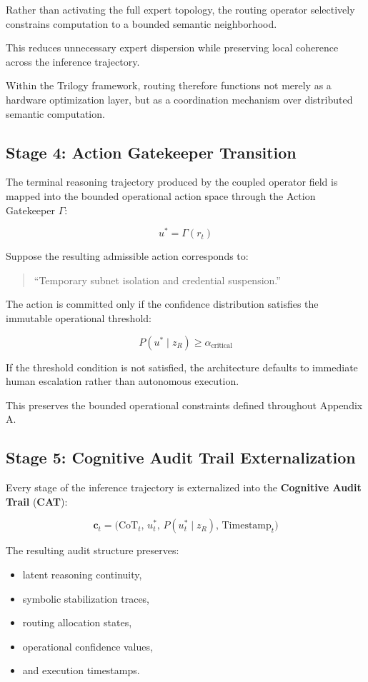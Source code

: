 Rather than activating the full expert topology, the routing operator selectively constrains computation to a bounded
semantic neighborhood.

This reduces unnecessary expert dispersion while preserving
local coherence across the inference trajectory.

Within the Trilogy framework, routing therefore functions not
merely as a hardware optimization layer, but as a coordination
mechanism over distributed semantic computation.

\subsection*{Stage 4: Action Gatekeeper Transition}

The terminal reasoning trajectory produced by the coupled operator field is mapped into the bounded operational action
space through the Action Gatekeeper \(\Gamma\):

\[
u^* = \Gamma(r_t)
\]

Suppose the resulting admissible action corresponds to:

\begin{quote}
``Temporary subnet isolation and credential suspension.''
\end{quote}

The action is committed only if the confidence distribution
satisfies the immutable operational threshold:

\[
P(u^* \mid z_R) \ge \alpha_{\text{critical}}
\]

If the threshold condition is not satisfied, the architecture
defaults to immediate human escalation rather than autonomous
execution.

This preserves the bounded operational constraints defined
throughout Appendix A.

\subsection*{Stage 5: Cognitive Audit Trail Externalization}

Every stage of the inference trajectory is externalized into the \textbf{Cognitive Audit Trail} (\textbf{CAT}):

\[
\mathbf{c}_t =
\Big(
\text{CoT}_t,\,
u_t^*,\,
P(u_t^* \mid z_R),\,
\text{Timestamp}_t
\Big)
\]

The resulting audit structure preserves:

\begin{itemize}
    \item latent reasoning continuity,
    \item symbolic stabilization traces,
    \item routing allocation states,
    \item operational confidence values,
    \item and execution timestamps.
\end{itemize}

